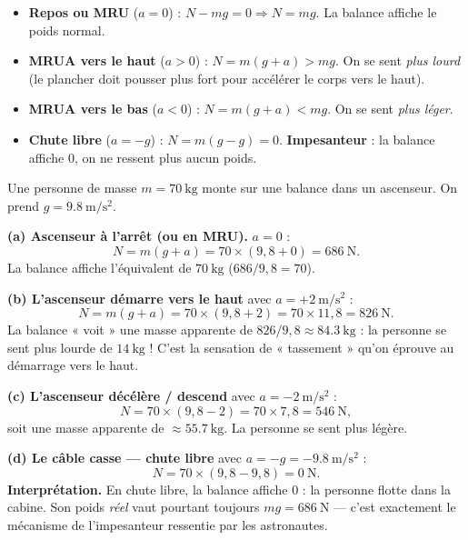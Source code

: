 \documentclass[11pt,a4paper]{article}
\begin{document}
\begin{theoreme}
\begin{itemize}[leftmargin=1.6em,topsep=2pt,itemsep=2pt]
  \item \textbf{Repos ou MRU} ($a=0$) : $N-mg=0\Rightarrow N=mg$. La balance affiche le
        poids normal.
  \item \textbf{MRUA vers le haut} ($a>0$) : $N=m(g+a)>mg$. On se sent \emph{plus lourd}
        (le plancher doit pousser plus fort pour accélérer le corps vers le haut).
  \item \textbf{MRUA vers le bas} ($a<0$) : $N=m(g+a)<mg$. On se sent \emph{plus léger}.
  \item \textbf{Chute libre} ($a=-g$) : $N=m(g-g)=0$. \textbf{Impesanteur} : la balance
        affiche $0$, on ne ressent plus aucun poids.
\end{itemize}
\end{theoreme}

\begin{exemple}
Une personne de masse $m=\SI{70}{\kilogram}$ monte sur une balance dans un ascenseur.
On prend $g=\SI{9.8}{\metre\per\second\squared}$.

\smallskip
\textbf{(a) Ascenseur à l'arrêt (ou en MRU).} $a=0$ :
\[
N=m(g+a)=70\times(9{,}8+0)=\SI{686}{\newton}.
\]
La balance affiche l'équivalent de $\SI{70}{\kilogram}$ ($686/9{,}8=70$).

\smallskip
\textbf{(b) L'ascenseur démarre vers le haut} avec $a=+\SI{2}{\metre\per\second\squared}$ :
\[
N=m(g+a)=70\times(9{,}8+2)=70\times 11{,}8=\SI{826}{\newton}.
\]
La balance « voit » une masse apparente de $826/9{,}8\approx\SI{84.3}{\kilogram}$ : la
personne se sent plus lourde de $\SI{14}{\kilogram}$ ! C'est la sensation de
« tassement » qu'on éprouve au démarrage vers le haut.

\smallskip
\textbf{(c) L'ascenseur décélère / descend} avec $a=-\SI{2}{\metre\per\second\squared}$ :
\[
N=70\times(9{,}8-2)=70\times 7{,}8=\SI{546}{\newton},
\]
soit une masse apparente de $\approx\SI{55.7}{\kilogram}$. La personne se sent plus légère.

\smallskip
\textbf{(d) Le câble casse — chute libre} avec $a=-g=-\SI{9.8}{\metre\per\second\squared}$ :
\[
N=70\times(9{,}8-9{,}8)=\SI{0}{\newton}.
\]
\textbf{Interprétation.} En chute libre, la balance affiche $0$ : la personne flotte
dans la cabine. Son poids \emph{réel} vaut pourtant toujours $mg=\SI{686}{\newton}$ —
c'est exactement le mécanisme de l'impesanteur ressentie par les astronautes.
\end{exemple}
\end{document}
